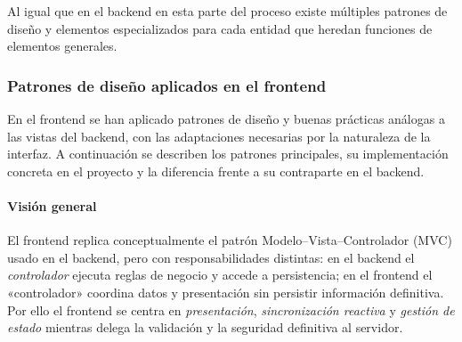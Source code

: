 \documentclass[12pt, a4paper]{article}
\begin{document}
Al igual que en el backend en esta parte del proceso existe múltiples patrones de diseño y elementos especializados para cada entidad que heredan funciones de elementos generales.

\subsubsection{Patrones de diseño aplicados en el frontend}

En el frontend se han aplicado patrones de diseño y buenas prácticas análogas a las vistas del backend, con las adaptaciones necesarias por la naturaleza de la interfaz. A continuación se describen los patrones principales, su implementación concreta en el proyecto y la diferencia frente a su contraparte en el backend.

\paragraph{Visión general}  
El frontend replica conceptualmente el patrón Modelo–Vista–Controlador (MVC) usado en el backend, pero con responsabilidades distintas: en el backend el \emph{controlador} ejecuta reglas de negocio y accede a persistencia; en el frontend el «controlador» coordina datos y presentación sin persistir información definitiva. Por ello el frontend se centra en \emph{presentación}, \emph{sincronización reactiva} y \emph{gestión de estado} mientras delega la validación y la seguridad definitiva al servidor.
\end{document}
